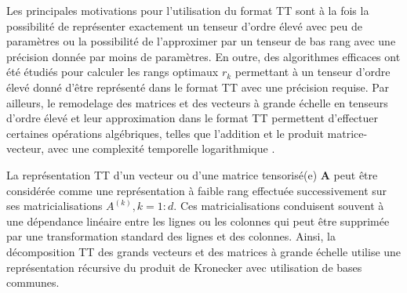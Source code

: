 \documentclass[11pt,a4paper,oneside]{book}
\newcommand{\mbf}[1]{\mathbf{#1}}
\begin{document}
Les principales motivations pour l'utilisation du format TT sont à la fois la possibilité de représenter exactement un tenseur d'ordre élevé avec peu de paramètres ou la possibilité de l'approximer par un tenseur de bas rang avec une précision donnée par moins de paramètres. En outre, des algorithmes efficaces ont été étudiés pour calculer les rangs optimaux $r_k$ permettant à un tenseur d'ordre élevé donné d'être représenté dans le format TT avec une précision requise. Par ailleurs, le remodelage des matrices et des vecteurs à grande échelle en tenseurs d'ordre élevé et leur approximation dans le format TT permettent d'effectuer certaines opérations algébriques, telles que l'addition et le produit matrice-vecteur, avec une complexité temporelle logarithmique \cite[p.142]{Nyenyezi2018}.

La représentation TT d'un vecteur ou d'une matrice tensorisé(e) $ \mbf{A} $ peut être considérée comme une représentation à faible rang effectuée successivement sur ses matricialisations $A^{(k)}, k = 1:d.$ Ces matricialisations conduisent souvent à une dépendance linéaire entre les lignes ou les colonnes qui peut être supprimée par une transformation standard des lignes et des colonnes. Ainsi, la décomposition TT des grands vecteurs et des matrices à grande échelle utilise une représentation récursive du produit de Kronecker avec utilisation de bases communes.
\end{document}
